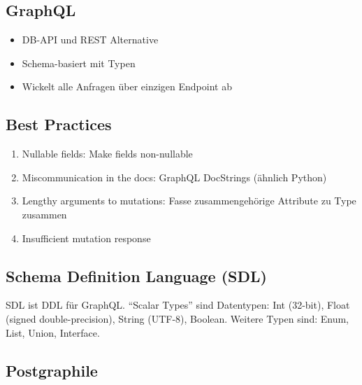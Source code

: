 \documentclass[a4paper, landscape, 8pt]{scrartcl}
\begin{document}
\begin{multicols*}{4}
        \section{GraphQL}
        \begin{itemize}
            \item DB-API und REST Alternative
            \item Schema-basiert mit Typen
            \item Wickelt alle Anfragen über einzigen Endpoint ab
        \end{itemize}

        \subsection{Best Practices}
        \begin{enumerate}
            \item Nullable fields: Make fields non-nullable
            \item Miscommunication in the docs: GraphQL DocStrings (ähnlich Python)
            \item Lengthy arguments to mutations: Fasse zusammengehörige Attribute zu Type zusammen
            \item Insufficient mutation response
        \end{enumerate}

        \subsection{Schema Definition Language (SDL)}
        SDL ist DDL für GraphQL.
        \enquote{Scalar Types} sind Datentypen: Int (32-bit), Float (signed double-precision), String (UTF-8), Boolean.
        Weitere Typen sind: Enum, List, Union, Interface.

        \subsection{Postgraphile}

\end{multicols*}
\end{document}
